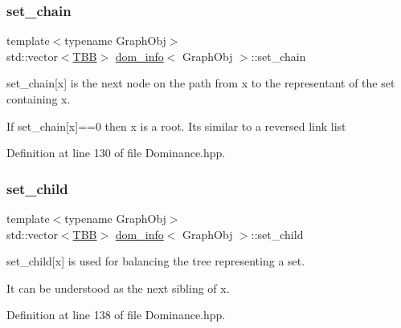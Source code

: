\mbox{\label{classdom__info_af1b668d5964ae434687fe63963b82715}} 
\subsubsection{\texorpdfstring{set\+\_\+chain}{set\_chain}}
{\footnotesize\ttfamily template$<$typename Graph\+Obj$>$ \\
std\+::vector$<$\hyperlink{Dominance_8hpp_ac35ffd4ddeccae8225d6ec6f55d65a97}{T\+BB}$>$ \hyperlink{classdom__info}{dom\+\_\+info}$<$ Graph\+Obj $>$\+::set\+\_\+chain\hspace{0.3cm}{\ttfamily [private]}}



set\+\_\+chain\mbox{[}x\mbox{]} is the next node on the path from x to the representant of the set containing x. 

If set\+\_\+chain\mbox{[}x\mbox{]}==0 then x is a root. It\textquotesingle{}s similar to a reversed link list 

Definition at line 130 of file Dominance.\+hpp.

\mbox{\label{classdom__info_afebd5dc533d9c834e5eb3d0de38e3f6b}} 
\subsubsection{\texorpdfstring{set\+\_\+child}{set\_child}}
{\footnotesize\ttfamily template$<$typename Graph\+Obj$>$ \\
std\+::vector$<$\hyperlink{Dominance_8hpp_ac35ffd4ddeccae8225d6ec6f55d65a97}{T\+BB}$>$ \hyperlink{classdom__info}{dom\+\_\+info}$<$ Graph\+Obj $>$\+::set\+\_\+child\hspace{0.3cm}{\ttfamily [private]}}



set\+\_\+child\mbox{[}x\mbox{]} is used for balancing the tree representing a set. 

It can be understood as the next sibling of x. 

Definition at line 138 of file Dominance.\+hpp.

\mbox{\label{classdom__info_a50d0342534f943036b870dd2823bb351}} 
